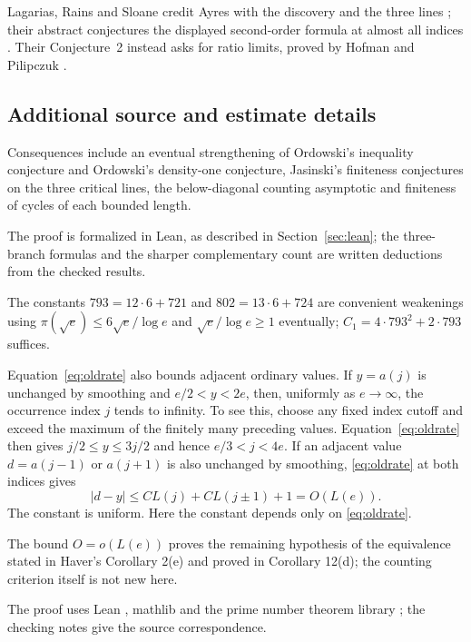Lagarias, Rains and Sloane credit Ayres with the discovery and the
three lines \cite[Section~1, first paragraph; Section~4]{lrs}; their abstract conjectures
the displayed second-order formula at almost all indices
\cite[abstract]{lrs}. Their Conjecture~2 instead asks for ratio limits,
proved by Hofman and Pilipczuk \cite[Theorem~4.17]{hp}.

\subsection*{Additional source and estimate details}
Consequences
include an eventual strengthening of Ordowski's inequality conjecture
and Ordowski's density-one conjecture, Jasinski's finiteness conjectures on the
three critical lines, the below-diagonal counting asymptotic and finiteness
of cycles of each bounded length.

The proof is formalized in Lean, as described in Section~\ref{sec:lean};
the three-branch formulas and the sharper complementary count are written
deductions from the checked results.

The constants $793=12\cdot6+721$ and $802=13\cdot6+724$ are convenient
weakenings using $\pi(\sqrt e)\leq6\sqrt e/\log e$ and
$\sqrt e/\log e\geq1$ eventually; $C_1=4\cdot793^2+2\cdot793$ suffices.

Equation~\eqref{eq:oldrate} also bounds adjacent ordinary values.
If $y=a(j)$ is unchanged by smoothing and $e/2<y<2e$, then, uniformly
as $e\to\infty$, the occurrence index $j$ tends to infinity.
To see this, choose any fixed index cutoff and exceed the maximum
of the finitely many preceding values. Equation~\eqref{eq:oldrate}
then gives $j/2\leq y\leq3j/2$ and hence $e/3<j<4e$.
If an adjacent value $d=a(j-1)$ or $a(j+1)$ is also unchanged by
smoothing, \eqref{eq:oldrate} at both indices gives
\begin{equation}\label{eq:adjacent-notes}
 |d-y|\leq C L(j)+C L(j\pm1)+1=O(L(e)).
\end{equation}
The constant is uniform. Here the constant depends only on \eqref{eq:oldrate}.



The bound $O=o(L(e))$ proves the remaining hypothesis of the equivalence
stated in Haver's Corollary 2(e) and proved in Corollary 12(d);
the counting criterion itself is not new here.

The proof uses Lean \cite{lean}, mathlib \cite{mathlib} and the prime
number theorem library \cite{pntcode}; the checking notes give the source correspondence.

